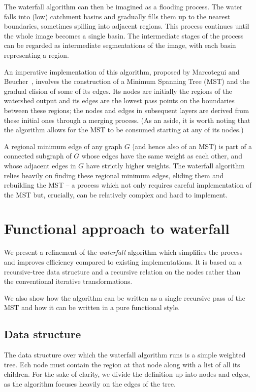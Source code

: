 \documentclass{jfp}
\begin{document}
The waterfall algorithm can then be imagined
as a flooding process. The water falls into (low) catchment basins and
gradually fills them up to the nearest boundaries, sometimes spilling
into adjacent regions. This process continues until the whole image
becomes a single basin. The intermediate stages of the process can be
regarded as intermediate segmentations of the image, with each basin
representing a region.

An imperative implementation of this algorithm, proposed by Marcotegui
and Beucher~\cite{marcotegui}, involves the construction of a Minimum
Spanning Tree (MST) and the gradual elision of some of its edges.  Its
nodes are initially the regions of the watershed output and its edges
are the lowest pass points on the boundaries between these regions;
the nodes and edges in subsequent layers are derived from these
initial ones through a merging process. (As an aside, it is worth
noting that the algorithm allows for the MST to be consumed starting
at any of its nodes.)

A regional minimum edge of any graph $G$ (and hence also of an MST) is
part of a connected subgraph of $G$ whose edges have the same weight
as each other, and whose adjacent edges in $G$ have strictly higher
weights. The waterfall algorithm relies heavily on finding these
regional minimum edges, eliding them and rebuilding the MST -- a
process which not only requires careful implementation of the MST but,
crucially, can be relatively complex and hard to implement.


\section{Functional approach to waterfall}


We present a refinement of the {\em waterfall\/} algorithm which
simplifies the process and improves efficiency compared to existing
implementations. It is based on a recursive-tree data structure and a
recursive relation on the nodes rather than the conventional iterative
transformations.

We also show how the algorithm can be written as a single recursive
pass of the MST and how it can be written in a pure functional style.


\subsection{Data structure}

The data structure over which the waterfall algorithm runs is a simple
weighted tree. Ech node must contain the region at that node along
with a list of all its children.  For the sake of clarity, we divide
the definition up into nodes and edges, as the algorithm focuses
heavily on the edges of the tree.
\end{document}
